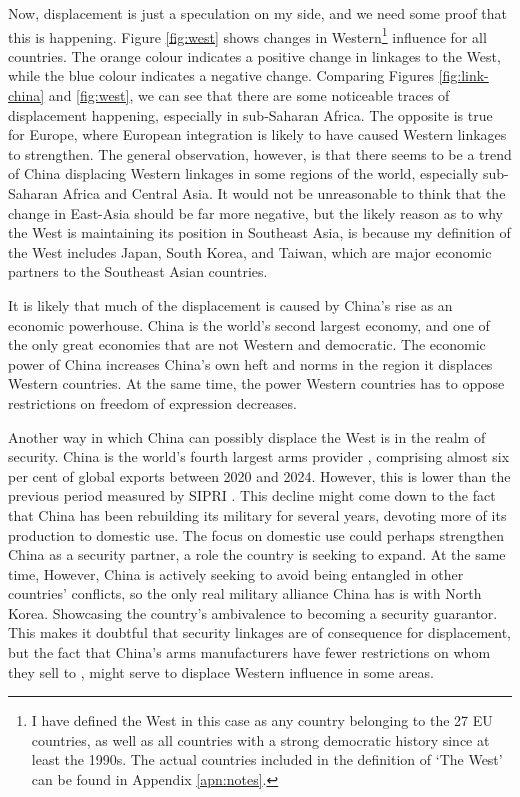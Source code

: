 Now, displacement is just a speculation on my side, and we need some proof that this is happening. Figure \ref{fig:west} shows changes in Western\footnote{I have defined the West in this case as any country belonging to the 27 EU countries, as well as all countries with a strong democratic history since at least the 1990s. The actual countries included in the definition of `The West' can be found in Appendix \ref{apn:notes}.} influence for all countries. The orange colour indicates a positive change in linkages to the West, while the blue colour indicates a negative change. Comparing Figures \ref{fig:link-china} and \ref{fig:west}, we can see that there are some noticeable traces of displacement happening, especially in sub-Saharan Africa. The opposite is true for Europe, where European integration is likely to have caused Western linkages to strengthen. The general observation, however, is that there seems to be a trend of China displacing Western linkages in some regions of the world, especially sub-Saharan Africa and Central Asia. It would not be unreasonable to think that the change in East-Asia should be far more negative, but the likely reason as to why the West is maintaining its position in Southeast Asia, is because my definition of the West includes Japan, South Korea, and Taiwan, which are major economic partners to the Southeast Asian countries. 

It is likely that much of the displacement is caused by China's rise as an economic powerhouse. China is the world's second largest economy, and one of the only great economies that are not Western and democratic. The economic power of China increases China's own heft and norms in the region it displaces Western countries. At the same time, the power Western countries has to oppose restrictions on freedom of expression decreases. 

Another way in which China can possibly displace the West is in the realm of security. China is the world's fourth largest arms provider \citep{george_trends_2025, gunter_chinas_2024}, comprising almost six per cent of global exports between 2020 and 2024. However, this is lower than the previous period measured by SIPRI \citep{george_trends_2025}. This decline might come down to the fact that China has been rebuilding its military for several years, devoting more of its production to domestic use. The focus on domestic use could perhaps strengthen China as a security partner, a role the country is seeking to expand. At the same time, However, China is actively seeking to avoid being entangled in other countries' conflicts, so the only real military alliance China has is with North Korea. Showcasing the country's ambivalence to becoming a security guarantor. This makes it doubtful that security linkages are of consequence for displacement, but the fact that China's arms manufacturers have fewer restrictions on whom they sell to \citep{gunter_chinas_2024}, might serve to displace Western influence in some areas.


